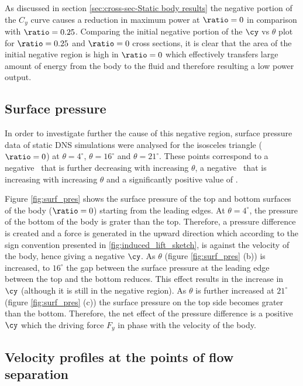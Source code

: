 As discussed in section \ref{sec:cross-sec-Static body results} the negative portion of the $C_y$ curve causes a reduction in maximum power at $\ratio=0$ in comparison with $\ratio=0.25$. Comparing  the initial negative portion of the $\cy$ vs $\theta$ plot for $\ratio=0.25$ and $\ratio=0$ cross sections, it is clear that the area of the initial negative region is high in $\ratio=0$ which effectively transfers large amount of energy from the body to the fluid and therefore resulting a low power output.  


\subsection{Surface pressure}
  \label{subsec:cross-sec-surface pressure}
  

In order to investigate further the cause of this negative region, surface pressure data of static DNS simulations were analysed for the isosceles triangle ($\ratio=0$) at $\theta=4^{\circ}$, $\theta=16^{\circ}$ and $\theta=21^{\circ}$. These points correspond to a negative \cy\ that is further decreasing with increasing $\theta$, a negative \cy\ that is increasing with increasing $\theta$ and a significantly positive value of \cy.   
  


Figure \ref{fig:surf_pres} shows the surface pressure of the top and bottom surfaces of the body ($\ratio=0$) starting from  the leading edges. At $\theta=4^{\circ}$, the pressure of the bottom of the body is grater than the top. Therefore, a pressure difference is created and a force is generated in the upward direction which according to the sign convention presented in \ref{fig:induced_lift_sketch}, is against the velocity of the body, hence giving a negative $\cy$. As $\theta$ (figure \ref{fig:surf_pres} (b)) is increased, to $16^{\circ}$ the gap between the surface pressure at the leading edge between the top and the bottom reduces. This effect results in the increase in $\cy$ (although it is still in the negative region). As $\theta$ is further increased at $21^{\circ}$ (figure \ref{fig:surf_pres} (c)) the surface pressure on the top side becomes grater than the bottom. Therefore, the net effect of the pressure difference is a positive $\cy$ which the driving force $F_y$ in phase with the velocity of the body. 

\subsection{Velocity profiles at the points of flow separation}

